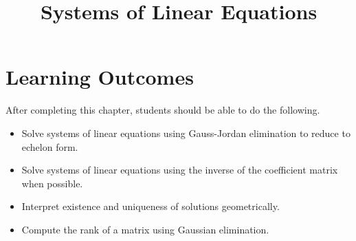 \documentclass{ximera}
\title{Systems of Linear Equations}
\begin{document}
\begin{abstract}

\end{abstract}
 
\maketitle
 
\section*{Learning Outcomes}
After completing this chapter, students should be able to do the following.
 
\begin{itemize}
    \item Solve systems of linear equations using Gauss-Jordan elimination to reduce to echelon form.
    \item  Solve systems of linear equations using the inverse of the coefficient matrix when possible.
    \item  Interpret existence and uniqueness of solutions geometrically.
    \item  Compute the rank of a matrix using Gaussian elimination.

\end{itemize}

 
\end{document}
